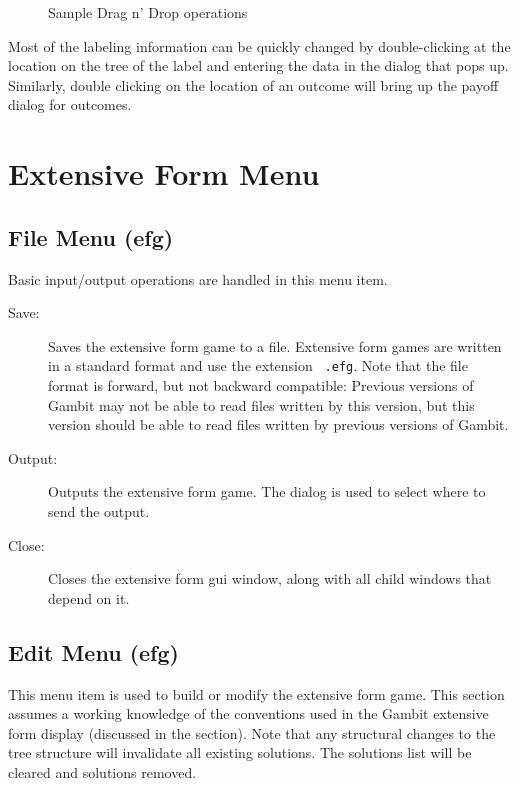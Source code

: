 \documentclass[12pt]{report}
\begin{document}
\begin{figure}
\caption{Sample Drag n' Drop operations}
\end{figure}

Most of the labeling information can be quickly changed by
double-clicking at the location on the tree of the label and entering
the data in the dialog that pops up.  Similarly, double clicking on
the location of an outcome will bring up the payoff dialog for
outcomes.

\section{Extensive Form Menu}

\subsection{File Menu (efg)}\label{effile}

Basic input/output operations are handled in this menu item.  

\begin{description}
\item[Save:] Saves the extensive form game to a file.  Extensive form
games are written in a standard format and use the extension {\tt 
.efg}. Note that the file format is forward, but not backward compatible:
Previous versions of Gambit may not be able to read files written by
this version, but this version should be able to read files written by
previous versions of Gambit.
\item[Output:] Outputs the extensive form game.  The  dialog is used to select where to send the output.
\item[Close:] Closes the extensive form gui window, along with all
child windows that depend on it.
\end{description}

\subsection{Edit Menu (efg)}\label{efedit}
This menu item is used to build or modify the extensive form game.
This section assumes a working knowledge of the conventions used in
the Gambit extensive form display (discussed in the  section).  Note that any structural changes to the
tree structure will invalidate all existing solutions.  The solutions
list will be cleared and solutions removed.
\end{document}
